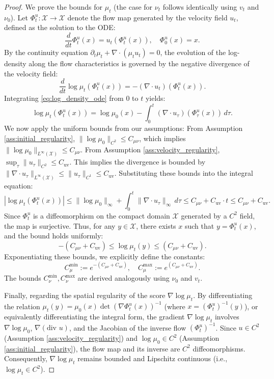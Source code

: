 \documentclass[11pt]{article}
\theoremstyle{definition}
\numberwithin{equation}{section}%
\begin{document}
{\begin{proof}
We prove the bounds for $\mu_t$ (the case for $\nu_t$ follows identically using $v_t$ and $\nu_0$).
Let $\Phi_t^u : \mathcal{X} \to \mathcal{X}$ denote the flow map generated by the velocity field $u_t$, defined as the solution to the ODE:
\[
\frac{d}{dt}\Phi_t^u(x) = u_t(\Phi_t^u(x)), \quad \Phi_0^u(x) = x.
\]
By the continuity equation $\partial_t \mu_t + \nabla \cdot (\mu_t u_t) = 0$, the evolution of the log-density along the flow characteristics is governed by the negative divergence of the velocity field:
\begin{equation}
\label{eq:log_density_ode}
\frac{d}{dt} \log \mu_t(\Phi_t^u(x)) = -(\nabla \cdot u_t)(\Phi_t^u(x)).
\end{equation}
Integrating \eqref{eq:log_density_ode} from $0$ to $t$ yields:
\[
\log \mu_t(\Phi_t^u(x)) = \log \mu_0(x) - \int_0^t (\nabla \cdot u_\tau)(\Phi_\tau^u(x)) \, d\tau.
\]
We now apply the uniform bounds from our assumptions: From Assumption \ref{ass:initial_regularity}, $\|\log \mu_0\|_{C^2} \le C_{\mu \nu}$, which implies $\|\log \mu_0\|_{L^\infty(\mathcal{X})} \le C_{\mu \nu}$. From Assumption \ref{ass:velocity_regularity}, $\sup_{\tau} \|u_\tau\|_{C^2} \le C_{\mathrm{uv}}$. This implies the divergence is bounded by $\|\nabla \cdot u_\tau\|_{L^\infty(\mathcal{X})} \le \|u_\tau\|_{C^1} \le C_{\mathrm{uv}}$. Substituting these bounds into the integral equation:
\[
\left| \log \mu_t(\Phi_t^u(x)) \right| \le \|\log \mu_0\|_\infty + \int_0^t \|\nabla \cdot u_\tau\|_\infty \, d\tau \le C_{\mu \nu} + C_{\mathrm{uv}} \cdot t \le C_{\mu \nu} + C_{\mathrm{uv}}.
\]
Since $\Phi_t^u$ is a diffeomorphism on the compact domain $\mathcal{X}$ generated by a $C^2$ field, the map is surjective. Thus, for any $y \in \mathcal{X}$, there exists $x$ such that $y = \Phi_t^u(x)$, and the bound holds uniformly:
\[
-(C_{\mu \nu} + C_{\mathrm{uv}}) \le \log \mu_t(y) \le (C_{\mu \nu} + C_{\mathrm{uv}}).
\]
Exponentiating these bounds, we explicitly define the constants:
\[
C_{\mu}^{\min} := e^{-(C_{\mu \nu} + C_{\mathrm{uv}})}, \quad C_{\mu}^{\max} := e^{(C_{\mu \nu} + C_{\mathrm{uv}})}.
\]
The bounds $C_{\nu}^{\min}, C_{\nu}^{\max}$ are derived analogously using $\nu_0$ and $v_t$. 

Finally, regarding the spatial regularity of the score $\nabla \log \mu_t$. By differentiating the relation $\mu_t(y) = \mu_0(x) \det(\nabla \Phi_t^u(x))^{-1}$ (where $x = (\Phi_t^u)^{-1}(y)$), or equivalently differentiating the integral form, the gradient $\nabla \log \mu_t$ involves $\nabla \log \mu_0$, $\nabla (\text{div } u)$, and the Jacobian of the inverse flow $(\Phi_t^u)^{-1}$. Since $u \in C^2$ (Assumption \ref{ass:velocity_regularity}) and $\log \mu_0 \in C^2$ (Assumption \ref{ass:initial_regularity}), the flow map and its inverse are $C^2$ diffeomorphisms. Consequently, $\nabla \log \mu_t$ remains bounded and Lipschitz continuous (i.e., $\log \mu_t \in C^2$).
\end{proof}

}
\end{document}

